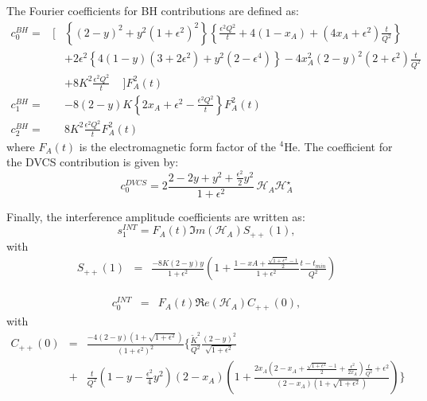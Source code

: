 \documentclass[aps,prc,preprint,superscriptaddress]{revtex4}
\begin{document}
The Fourier coefficients for BH contributions are defined as:
\begin{eqnarray}
c_0^{BH} = & \bigg[ & \left\{ {(2-y)}^2 + y^2{(1+\epsilon^2)}^2 \right\} 
\left\{ \frac{\epsilon^2 Q^2}{t} + 4 (1-x_A) + (4x_A+\epsilon^2) \frac{t}{Q^2} 
\right\} \nonumber \\
& \phantom{\bigg[} & + 2 \epsilon^2 \left\{ 4(1-y)(3+2\epsilon^2) + y^2(2-\epsilon^4) 
\right\} - 4 x_A^2{(2-y)}^2 (2+\epsilon^2) \frac{t}{Q^2} \nonumber \\
& \phantom{\bigg[} & + 8 K^2 \frac{\epsilon^2 Q^2}{t} \,\,\,\,\,\,\, \bigg] F_A^2(t)  \\
c_1^{BH} = & \phantom{\bigg[} & -8 (2-y) K \left\{ 2 x_A + \epsilon^2 - 
\frac{\epsilon^2 Q^2}{t} \right\} F_A^2(t)  \\
c_2^{BH} = & \phantom{\bigg[} & 8 K^2 \frac{\epsilon^2 Q^2}{t} F_A^2(t) 
\end{eqnarray} 
where $F_A(t)$ is the electromagnetic form factor of the $^4$He. 
The coefficient for the DVCS contribution is given by: 
\begin{equation}
   c_0^{DVCS}= 2 \frac{2-2y+y^2 + \frac{\epsilon^2}{2}y^2}{1 + \epsilon^2} \, 
   {\mathcal H}_A {\mathcal H}^{\star}_A 
   \label{eq:c0DVCS}
\end{equation}

Finally, the interference amplitude coefficients are written as:
\begin{equation}
s_{1}^{INT} = F_{A}(t) \Im m(\mathcal{H}_{A}) S_{++}(1),
\end{equation}
with
\begin{eqnarray}
   S_{++}(1) &=& \frac{-8K(2-y)y}{1+\epsilon^2} \left( 1 + 
\frac{1-xA+\frac{\sqrt{1+\epsilon^2}-1}{2}}{1+\epsilon^2} 
\frac{t-t_{min}}{Q^{2}} \right) \label{eq:s1I}
\end{eqnarray}

\begin{eqnarray}
c_0^{INT} &=& F_A(t) \Re e(\mathcal{H}_{A}) C_{++}(0),
\end{eqnarray}
with \begin{eqnarray}  C_{++}(0) &=&
\frac{-4(2-y)(1+\sqrt{1+\epsilon^{2}})}{(1+\epsilon^{2})^2}  \bigg\{ 
   \frac{\widetilde{K}^2}{Q^2}  \frac{(2-y)^2}{\sqrt{1+\epsilon^{2}}} \, \\
   &+& \frac{t}{Q^2}  \left( 1 - y - \frac{\epsilon^2}{4} y^2 \right)  
(2-x_{A}) \left(  1 + \frac{2x_A(2-x_A + \frac{\sqrt{1+\epsilon^{2}}-1}{2} + 
\frac{\epsilon^{2}}{2x_A})\frac{t}{Q^2} + \epsilon^{2}}{(2-x_A) 
(1+\sqrt{1+\epsilon^{2}})}  \right)  \bigg\} \nonumber
 \label{eq:c0I} 
 \end{eqnarray}
\end{document}
